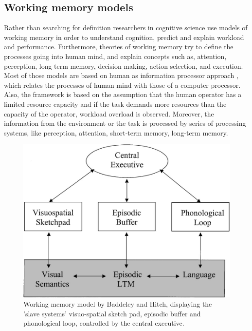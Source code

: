 \documentclass[a4paper]{report}
\begin{document}
			\subsection{Working memory models}
			Rather than searching for definition researchers in cognitive science use models of working memory in order to understand cognition, predict and explain workload and performance. Furthermore, theories of working memory try to define the processes going into human mind, and explain concepts such as, attention, perception, long term memory, decision making, action selection, and execution\cite{wickens-1988,baddeley1974working,miller1956magical}. 			Most of those models are based on human as information processor approach \cite{broadbent1,broadbent2,neisser,wickens-1988}, which relates the processes of human mind with those of a computer processor. Also, the framework is based on the assumption that the human operator has a limited resource capacity\cite{kahneman1973attention,wickenshollands1999} and if the task demands more resources than the capacity of the operator, workload overload is observed. Moreover, the information from the environment or the task is processed by series of processing systems, like perception, attention, short-term memory, long-term memory.			
			\begin{figure}[h]
				\centering
				\includegraphics[width=0.7\linewidth]{baddeley-wm}
				\caption[Baddeley and Hitch Working memory model]{Working memory model by Baddeley and Hitch, displaying the 'slave systems' visuo-spatial sketch pad, episodic buffer and phonological loop, controlled by the central executive.}
				\label{fig:baddeley-wm}
			\end{figure} 
		
\end{document}
